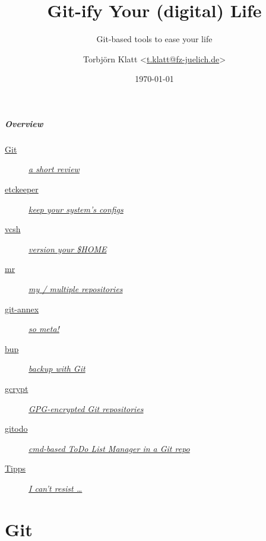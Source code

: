 \documentclass[english,hyperref={pdfpagelabels=false},aspectratio=169]{beamer}
\title{Git-ify Your (digital) Life}
\subtitle{Git-based tools to ease your life}
\author{Torbjörn Klatt <\href{mailto:t.klatt@fz-juelich.de}{t.klatt@fz-juelich.de}>}
\institute{JSC Internal Seminar}
\date{\today}
\begin{document}
\maketitle

\begin{frame}
  \frametitle{Overview}
  \begin{description}
    \item[\hyperlink{git}{Git}] \hyperlink{git}{\textit{a short review}}
    \item[\hyperlink{etckeeper}{etckeeper}] \hyperlink{etckeeper}{\textit{keep your system's configs}}
    \item[\hyperlink{vcsh}{vcsh}] \hyperlink{vcsh}{\textit{version your \$HOME}}
    \item[\hyperlink{mr}{mr}] \hyperlink{mr}{\textit{my / multiple repositories}}
    \item[\hyperlink{gitannex}{git-annex}] \hyperlink{gitannex}{\textit{so meta!}}
    \item[\hyperlink{bup}{bup}] \hyperlink{bup}{\textit{backup with Git}}
    \item[\hyperlink{gcrypt}{gcrypt}] \hyperlink{gcrypt}{\textit{GPG-encrypted Git repositories}}
    \item[\hyperlink{gitodo}{gitodo}] \hyperlink{gitodo}{\textit{cmd-based ToDo List Manager in a Git repo}}
    \item[\hyperlink{tipps}{Tipps}] \hyperlink{tipps}{\textit{I can't resist \dots}}
  \end{description}
\end{frame}


\part{Git}
\makepart
\end{document}
